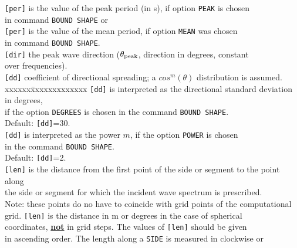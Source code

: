 \documentclass[12pt]{book}
\begin{document}
\begin{tabbing}
                        {\tt [per]} \> is the value of the peak period (in s), if option {\tt PEAK} is chosen\+\\
                                       in command {\tt BOUND SHAPE} or\-\\
                        {\tt [per]} \> is the value of the mean period, if option {\tt MEAN} was chosen\+\\
                                       in command {\tt BOUND SHAPE}.\-\-\\
                        \poptabs
{\tt [dir]}          \> the peak wave direction ($\theta_{\rm peak}$, direction in degrees, constant\+\\
                        over frequencies).\-\\
{\tt [dd]}           \> coefficient of directional spreading; a $cos^m(\theta)$ distribution is assumed.\+\\
                        \pushtabs
                        xxxxxx\=xxxxxxxxxxxxx \kill
                        {\tt [dd]} \> is interpreted as the directional standard deviation in degrees,\+\\
                                      if the option {\tt DEGREES} is chosen in the command {\tt BOUND SHAPE}.\\
                                      Default: {\tt [dd]}=30.\-\\
                        {\tt [dd]} \> is interpreted as the power $m$, if the option {\tt POWER} is chosen\+\\
                                      in the command {\tt BOUND SHAPE}.\\
                                      Default: {\tt [dd]}=2.\-\-\\
                        \poptabs
{\tt [len]}          \> is the distance from the first point of the side or segment to the point along\+\\
                        the side or segment for which the incident wave spectrum is prescribed.\\
                        Note: these points do no have to coincide with grid points of the computational\\
                        grid. {\tt [len]} is the distance in m or degrees in the case of spherical\\
                        coordinates, \underline{{\bf not}} in grid steps. The values of {\tt [len]} should be given\\
                        in ascending order. The length along a {\tt SIDE} is measured in clockwise or\\

\end{tabbing}
\end{document}
